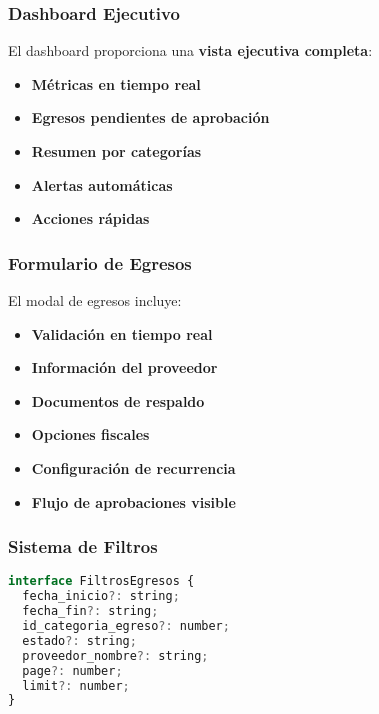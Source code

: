 \documentclass[12pt,a4paper]{article}
\newcommand{\highlight}[1]{\textcolor{primaryblue}{\textbf{#1}}}
\newcommand{\success}[1]{\textcolor{secondarygreen}{\textbf{#1}}}
\begin{document}
\subsubsection{Dashboard Ejecutivo}
El dashboard proporciona una \highlight{vista ejecutiva completa}:

\begin{itemize}[leftmargin=*]
    \item \success{Métricas en tiempo real}
    \item \success{Egresos pendientes de aprobación}
    \item \success{Resumen por categorías}
    \item \success{Alertas automáticas}
    \item \success{Acciones rápidas}
\end{itemize}

\subsubsection{Formulario de Egresos}
El modal de egresos incluye:

\begin{itemize}[leftmargin=*]
    \item \success{Validación en tiempo real}
    \item \success{Información del proveedor}
    \item \success{Documentos de respaldo}
    \item \success{Opciones fiscales}
    \item \success{Configuración de recurrencia}
    \item \success{Flujo de aprobaciones visible}
\end{itemize}

\subsubsection{Sistema de Filtros}
\begin{lstlisting}[language=JavaScript, caption=Filtros avanzados implementados]
interface FiltrosEgresos {
  fecha_inicio?: string;
  fecha_fin?: string;
  id_categoria_egreso?: number;
  estado?: string;
  proveedor_nombre?: string;
  page?: number;
  limit?: number;
}
\end{lstlisting}

\end{document}
